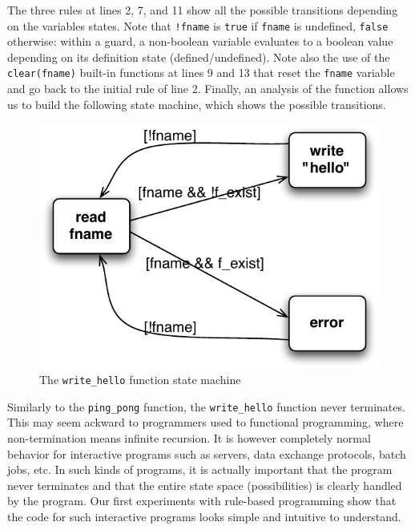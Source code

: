 \documentclass{sig-alternate}
\begin{document}
The three rules at lines 2, 7, and 11 show all the possible transitions depending on the variables states. Note that \texttt{!fname} is \texttt{true} if \texttt{fname} is undefined, \texttt{false} otherwise: within a guard, a non-boolean variable evaluates to a boolean value depending on its definition state (defined/undefined). Note also the use of the \texttt{clear(fname)} built-in functions at lines 9 and 13 that reset the \texttt{fname} variable and go back to the initial rule of line 2. Finally, an analysis of the function allows us to build the following state machine, which shows the possible transitions.

\begin{figure}[htbp]
\begin{center}
\includegraphics[scale=0.6]{read_sm.pdf} 
\caption{The \texttt{write\_hello} function state machine}
\label{default}
\end{center}
\end{figure}

Similarly to the \texttt{ping\_pong} function, the \texttt{write\_hello} function never terminates. This may seem ackward to programmers used to functional programming, where non-termination means infinite recursion. It is however completely normal behavior for interactive programs such as servers, data exchange protocols, batch jobs, etc. In such kinds of programs, it is actually important that the program never terminates and that the entire state space (possibilities) is clearly handled by the program. Our first experiments with rule-based programming show that the code for such interactive programs looks simple and intuitive to understand. 
\end{document}

